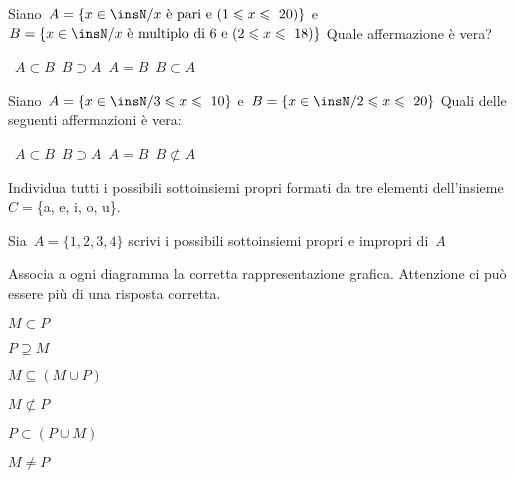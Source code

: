 \begin{esercizio}
\label{ese:7.40}
 Siano~$A=\{x\in\insN/x \text{ è pari e }(1\leqslant x\leqslant~20)\}$ 
e~$B=\{x\in\insN/x \text{ è multiplo di~6 e }(2\leqslant x\leqslant~18)\}$
Quale affermazione è vera?
\begin{center}
 \boxA\quad~$A\subset B$\quad\boxB\quad~$B\supset 
A$\quad\boxC\quad~$A=B$\quad\boxD\quad~$B\subset A$
\end{center}
\end{esercizio}

\begin{esercizio}
\label{ese:7.41}
Siano~$A=\{x\in\insN/3\leqslant x\leqslant~10\}$ e~$B=\{x\in\insN/2\leqslant 
x\leqslant~20\}$
Quali delle seguenti affermazioni è vera:
\begin{center}
 \boxA\quad~$A\subset B$\quad\boxB\quad~$B\supset 
A$\quad\boxC\quad~$A=B$\quad\boxD\quad~$B\not\subset A$
\end{center}
\end{esercizio}

\begin{esercizio}
\label{ese:7.42}
Individua tutti i possibili sottoinsiemi propri formati da tre elementi 
dell'insieme~$C=$\{a, e, i, o, u\}.
\end{esercizio}

\begin{esercizio}
\label{ese:7.43}
Sia~$A=\{1,2,3,4\}$ scrivi i possibili sottoinsiemi propri e impropri di~$A$
\end{esercizio}

\begin{esercizio}
\label{ese:7.44}
Associa a ogni diagramma la corretta rappresentazione grafica. Attenzione ci può 
essere più di una risposta corretta.
\begin{multicols}{2}
\begin{enumeratea}
 \item $M\subset P$ \hfill\boxA\quad\boxB\quad\boxC\quad\boxD\quad\boxE
\item $P\supseteq M$ \hfill\boxA\quad\boxB\quad\boxC\quad\boxD\quad\boxE
\item $M\subseteq (M\cup P)$ \hfill\boxA\quad\boxB\quad\boxC\quad\boxD\quad\boxE
\item $M\not\subset P$ \hfill\boxA\quad\boxB\quad\boxC\quad\boxD\quad\boxE
\item $P\subset (P\cup M)$ \hfill\boxA\quad\boxB\quad\boxC\quad\boxD\quad\boxE
\item $M\neq P$ \hfill\boxA\quad\boxB\quad\boxC\quad\boxD\quad\boxE
\end{enumeratea}
\end{multicols}
\begin{center}

\end{center}
\end{esercizio}

